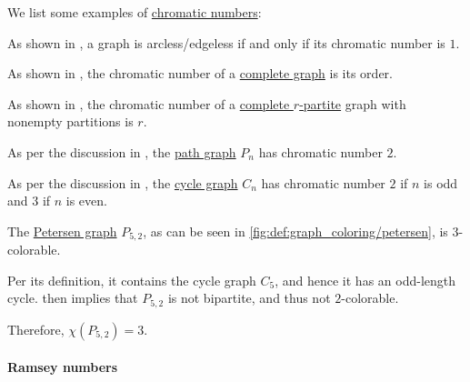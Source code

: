 \begin{example}\label{ex:def:chromatic_number}
  We list some examples of \hyperref[def:chromatic_number]{chromatic numbers}:
  \begin{thmenum}
     As shown in , a graph is arcless/edgeless if and only if its chromatic number is \( 1 \).

     As shown in , the chromatic number of a \hyperref[def:complete_graph]{complete graph} is its order.

     As shown in , the chromatic number of a \hyperref[def:complete_multipartite_graph]{complete \( r \)-partite} graph with nonempty partitions is \( r \).

     As per the discussion in , the \hyperref[def:path_graph]{path graph} \( P_n \) has chromatic number \( 2 \).

     As per the discussion in , the \hyperref[def:cycle_graph]{cycle graph} \( C_n \) has chromatic number \( 2 \) if \( n \) is odd and \( 3 \) if \( n \) is even.

     The \hyperref[def:petersen_graph]{Petersen graph} \( P_{5,2} \), as can be seen in \cref{fig:def:graph_coloring/petersen}, is \( 3 \)-colorable.

    Per its definition, it contains the cycle graph \( C_5 \), and hence it has an odd-length cycle.  then implies that \( P_{5,2} \) is not bipartite, and thus not \( 2 \)-colorable.

    Therefore, \( \chi(P_{5,2}) = 3 \).
  \end{thmenum}
\end{example}

\paragraph{Ramsey numbers}

